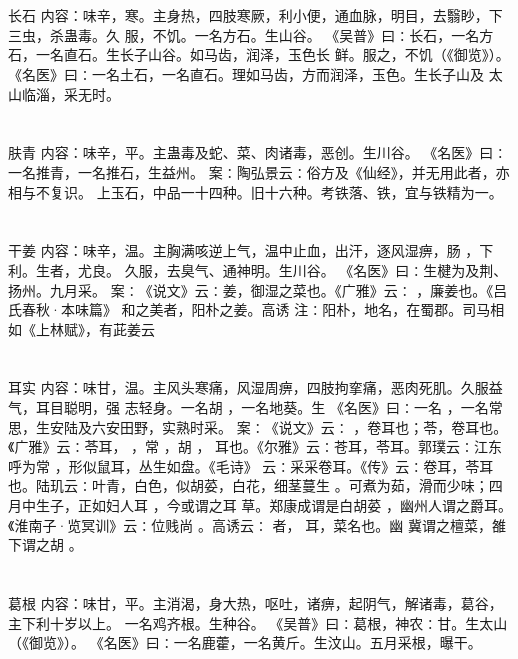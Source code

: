 \documentclass[12pt,UTF8]{ctexbook}
\begin{document}
\section{}长石
内容：味辛，寒。主身热，四肢寒厥，利小便，通血脉，明目，去翳眇，下三虫，杀蛊毒。久 
服，不饥。一名方石。生山谷。 
《吴普》曰∶长石，一名方石，一名直石。生长子山谷。如马齿，润泽，玉色长 
鲜。服之，不饥（《御览》）。 
《名医》曰∶一名土石，一名直石。理如马齿，方而润泽，玉色。生长子山及 
太山临淄，采无时。 


\section{}肤青
内容：味辛，平。主蛊毒及蛇、菜、肉诸毒，恶创。生川谷。 
《名医》曰∶一名推青，一名推石，生益州。 
案∶陶弘景云∶俗方及《仙经》，并无用此者，亦相与不复识。 
上玉石，中品一十四种。旧十六种。考铁落、铁，宜与铁精为一。 


\section{}干姜
内容：味辛，温。主胸满咳逆上气，温中止血，出汗，逐风湿痹，肠 ，下利。生者，尤良。 
久服，去臭气、通神明。生川谷。 
《名医》曰∶生楗为及荆、扬州。九月采。 
案∶《说文》云∶姜，御湿之菜也。《广雅》云∶ ，廉姜也。《吕氏春秋·本味篇》 
和之美者，阳朴之姜。高诱 
注∶阳朴，地名，在蜀郡。司马相如《上林赋》，有茈姜云 


\section{}耳实
内容：味甘，温。主风头寒痛，风湿周痹，四肢拘挛痛，恶肉死肌。久服益气，耳目聪明，强 
志轻身。一名胡 ，一名地葵。生 
《名医》曰∶一名 ，一名常思，生安陆及六安田野，实熟时采。 
案∶《说文》云∶ ，卷耳也；苓，卷耳也。《广雅》云∶苓耳， ，常 ，胡 ， 
耳也。《尔雅》云∶苍耳，苓耳。郭璞云∶江东呼为常 ，形似鼠耳，丛生如盘。《毛诗》 
云∶采采卷耳。《传》云∶卷耳，苓耳也。陆玑云∶叶青，白色，似胡荽，白花，细茎蔓生 
。可煮为茹，滑而少味；四月中生子，正如妇人耳 ，今或谓之耳 草。郑康成谓是白胡荽 
，幽州人谓之爵耳。《淮南子·览冥训》云∶位贱尚 。高诱云∶ 者， 耳，菜名也。幽 
冀谓之檀菜，雒下谓之胡 。 


\section{}葛根
内容：味甘，平。主消渴，身大热，呕吐，诸痹，起阴气，解诸毒，葛谷，主下利十岁以上。 
一名鸡齐根。生种谷。 
《吴普》曰∶葛根，神农∶甘。生太山（《御览》）。 
《名医》曰∶一名鹿藿，一名黄斤。生汶山。五月采根，曝干。 
\end{document}
